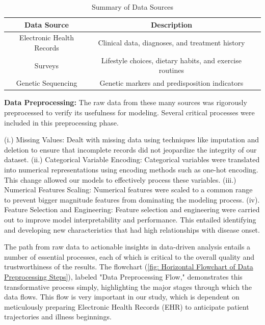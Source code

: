 \documentclass[manuscript,screen,]{acmart}
\begin{document}
\begin{table}[h]
    \centering
    \begin{tabular}{|c|c|c|}
    \hline
    Data Source & Description\\
    \hline
    Electronic Health Records & Clinical data, diagnoses, and treatment history\\
    \hline
    Surveys & Lifestyle choices, dietary habits, and exercise routines\\
    \hline
    Genetic Sequencing & Genetic markers and predisposition indicators\\
    \hline
    \end{tabular}
    \caption{Summary of Data Sources}
    \label{tab: Summary of Data Sources}
    
\end{table}

\textbf{Data Preprocessing:}
    The raw data from these many sources was rigorously preprocessed to verify its usefulness for modeling. Several critical processes were included in this preprocessing phase.
    
(i.) Missing Values: Dealt with missing data using techniques like imputation and deletion to ensure that incomplete records did not jeopardize the integrity of our dataset.
(ii.) Categorical Variable Encoding: Categorical variables were translated into numerical representations using encoding methods such as one-hot encoding. This change allowed our models to effectively process these variables.
(iii.) Numerical Features Scaling: Numerical features were scaled to a common range to prevent bigger magnitude features from dominating the modeling process.
(iv). Feature Selection and Engineering: Feature selection and engineering were carried out to improve model interpretability and performance. This entailed identifying and developing new characteristics that had high relationships with disease onset.

The path from raw data to actionable insights in data-driven analysis entails a number of essential processes, each of which is critical to the overall quality and trustworthiness of the results. The flowchart (\ref{fig: Horizontal Flowchart of Data Preprocessing Steps}), labeled "Data Preprocessing Flow," demonstrates this transformative process simply, highlighting the major stages through which the data flows. This flow is very important in our study, which is dependent on meticulously preparing Electronic Health Records (EHR) to anticipate patient trajectories and illness beginnings.
\end{document}
